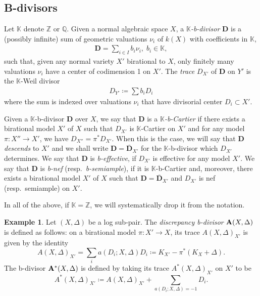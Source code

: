 \documentclass{amsart}
\newcommand{\rar}{\rightarrow}
\theoremstyle{definition}
\newtheorem{example}[theorem]{Example}
\theoremstyle{remark}
\def\bZ{\mathbb{Z}}
\def\bQ{\mathbb{Q}}
\newcommand\bfA{{\bf A}}
\numberwithin{equation}{section}
\begin{document}
\subsection{B-divisors}
Let $\mathbb{K}$ denote $\bZ$ or $\bQ$.
Given a normal algebraic space $X$, 
a {\it $\mathbb{K}$-b-divisor} 
$\mathbf{D}$ is a (possibly infinite) sum 
of geometric valuations $\nu_i$ 
of $k(X)$ with coefficients in 
$\mathbb{K}$, 
\begin{align*}
 \mathbf{D}= \sum_{i \in I} b_i \nu_i, \; b_i \in \mathbb{K},
\end{align*}
such that, given any normal variety 
$X'$ birational to $X$, 
only finitely many valuations 
$\nu_{i}$ have a center of codimension 1 on 
$X'$. The {\it trace} $D_{X'}$ 
of $\mathbf{D}$ on $Y'$ is the 
$\mathbb{K}$-Weil divisor 
\begin{align*}
D_{Y'} 
 \coloneqq  \sum b_i D_i
\end{align*}
where the sum is indexed over valuations $\nu_{i}$ 
that have divisorial center $D_i\subset X'$.

Given a $\mathbb{K}$-b-divisor $\mathbf{D}$ 
over $X$, we say that $\mathbf{D}$ 
is a {\it $\mathbb{K}$-b-Cartier} 
if there exists a birational model 
$X'$ of $X$ such that $D_{X'}$ 
is $\mathbb K$-Cartier on $X'$ and for any model 
$\pi \colon X''  \rar X'$, we have
$D_{X''} = \pi^\ast D_{X'}$.
When this is the case, we will say that 
$\mathbf{D}$ \emph{descends} to $X'$
and we shall write 
$\mathbf{D}= \overline{\mathbf{D}}_{X'}$
for the $\mathbb K$-b-divisor which $D_{X'}$ determines. We say that $\mathbf{D}$ is {\it b-effective}, 
if $D_{X'}$ is effective for any model 
$X'$. We say that $\mathbf{D}$ is {\it b-nef} 
(resp.\ {\it b-semiample}), 
if it is $\mathbb{K}$-b-Cartier 
and, moreover, there exists a birational model 
$X'$ of $X$ such that 
$\mathbf{D}= \overline{\mathbf{D}}_{X'}$ 
and $D_{X'}$ is nef 
(resp.\ semiample) on $X'$. 

In all of the above, if $\mathbb{K}= \bZ$, 
we will systematically drop it from the notation.

\begin{example}
Let $(X, \Delta)$ be a log sub-pair.  
The \emph{discrepancy b-divisor} $\bfA(X, \Delta)$ is defined as follows: on a birational model $\pi : X' \to X$, its trace $A(X, \Delta)_{X'}$ is given by the identity
\[
A(X, \Delta)_{X'} = \sum_i a(D_i; X, \Delta) D_i \coloneqq  K_{X'} - \pi^*(K_X + \Delta).\]
The b-divisor $\bfA^*(X, \Delta)$ is defined by taking its trace $A^*(X, \Delta)_{X'}$ on $X'$ to be
\[
A^*(X, \Delta)_{X'}  \coloneqq  A(X, \Delta)_{X'} + \sum_{a(D_i; X, \Delta) =-1} D_i.\]
\end{example}
\end{document}
